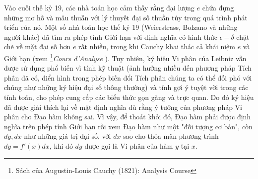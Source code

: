 \documentclass[a4paper,12pt]{article}
\begin{document}
Vào cuối thế kỷ 19, các nhà toán học cảm thấy rằng đại lượng $e$ chứa đựng những mơ hồ và mâu thuẫn với lý thuyết đại số thuần túy trong quá trình phát triển của nó. Một số nhà toán học thế kỷ 19 (Weierstrass, Bolzano và những người khác) đã tìm ra phép tính Giới hạn với định nghĩa có hình thức $\epsilon - \delta$ chặt chẽ về mặt đại số hơn $e$ rất nhiều, trong khi Cauchy khai thác cả khái niệm $e$ và Giới hạn (xem \footnote{Sách của Augustin-Louis Cauchy (1821): Analysis Course}\textit{Cours d'Analyse} ). Tuy nhiên, ký hiệu Vi phân của Leibniz vẫn được sử dụng phổ biến vì tính kỹ thuật (ảnh hưởng nhiều đến phương pháp Tích phân đã có, điển hình trong phép biến đổi Tích phân chúng ta có thể đối phó với chúng như những ký hiệu đại số thông thường) và tính gợi ý tuyệt vời trong các tính toán, cho phép cung cấp các biểu thức gọn gàng và trực quan. Do đó ký hiệu đã được giải thích lại về mặt định nghĩa dù rằng ý tưởng của phương pháp Vi phân cho Đạo hàm không sai. Vì vậy, để thoát khỏi đó, Đạo hàm phải được định nghĩa trên phép tính Giới hạn rồi xem Đạo hàm như một "đối tượng cơ bản", còn $dy, dx$ như những giá trị đại số, với $dx$ sao cho thỏa mãn phương trình $dy=f'(x)dx$, khi đó $dy$ được gọi là Vi phân của hàm $y$ tại $x$.
\end{document}
